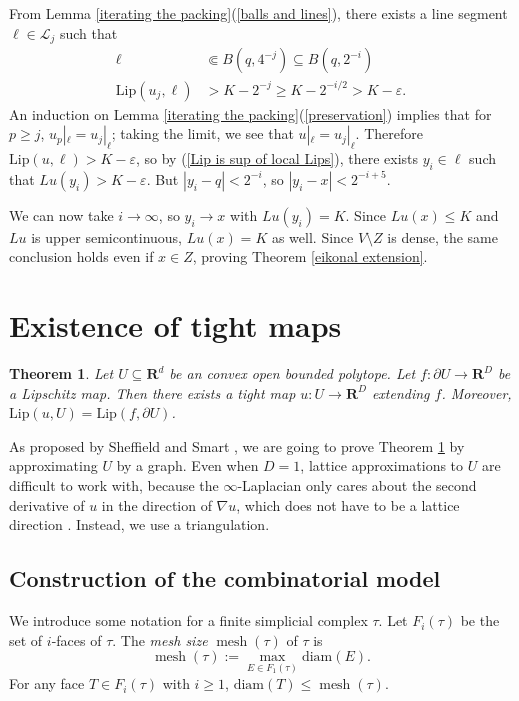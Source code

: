\documentclass[reqno,11pt]{amsart}
\newcommand{\RR}{\mathbf{R}}
\DeclareMathOperator{\mesh}{mesh}
\newcommand{\diam}{\mathrm{diam}}
\newcommand{\Lip}{\mathrm{Lip}}
\newcommand{\dfn}[1]{\emph{#1}\index{#1}}
\newtheorem{theorem}{Theorem}[section]
\theoremstyle{definition}
\numberwithin{equation}{section}
\begin{document}
From Lemma \ref{iterating the packing}(\ref{balls and lines}), there exists a line segment $\ell \in \mathscr L_j$ such that
\begin{align*}
\ell &\Subset B(q, 4^{-j}) \subseteq B(q, 2^{-i}) \\
\Lip(u_j, \ell) &> K - 2^{-j} \geq K - 2^{-i/2} > K - \varepsilon.
\end{align*}
An induction on Lemma \ref{iterating the packing}(\ref{preservation}) implies that for $p \geq j$, $u_p|_\ell = u_j|_\ell$; taking the limit, we see that $u|_\ell = u_j|_\ell$.
Therefore $\Lip(u, \ell) > K - \varepsilon$, so by (\ref{Lip is sup of local Lips}), there exists $y_i \in \ell$ such that $Lu(y_i) > K - \varepsilon$.
But $|y_i - q| < 2^{-i}$, so $|y_i - x| < 2^{-i + 5}$.

We can now take $i \to \infty$, so $y_i \to x$ with $Lu(y_i) = K$.
Since $Lu(x) \leq K$ and $Lu$ is upper semicontinuous, $Lu(x) = K$ as well.
Since $V \setminus Z$ is dense, the same conclusion holds even if $x \in Z$, proving Theorem \ref{eikonal extension}.



\section{Existence of tight maps}
\begin{theorem}\label{existence of tight maps}
Let $U \subseteq \RR^d$ be an convex open bounded polytope.
Let $f: \partial U \to \RR^D$ be a Lipschitz map.
Then there exists a tight map $u: U \to \RR^D$ extending $f$.
Moreover, $\Lip(u, U) = \Lip(f, \partial U)$.
\end{theorem}

As proposed by Sheffield and Smart \cite[Question 5.1]{Sheffield12}, we are going to prove Theorem \ref{existence of tight maps} by approximating $U$ by a graph.
Even when $D = 1$, lattice approximations to $U$ are difficult to work with, because the $\infty$-Laplacian only cares about the second derivative of $u$ in the direction of $\nabla u$, which does not have to be a lattice direction \cite[\S3]{Oberman13}.
Instead, we use a triangulation.

\subsection{Construction of the combinatorial model}
We introduce some notation for a finite simplicial complex $\tau$.
Let $F_i(\tau)$ be the set of $i$-faces of $\tau$.
The \dfn{mesh size} $\mesh(\tau)$ of $\tau$ is 
$$\mesh(\tau) := \max_{E \in F_1(\tau)} \diam(E).$$
For any face $T \in F_i(\tau)$ with $i \geq 1$, $\diam(T) \leq \mesh(\tau)$.
\end{document}
